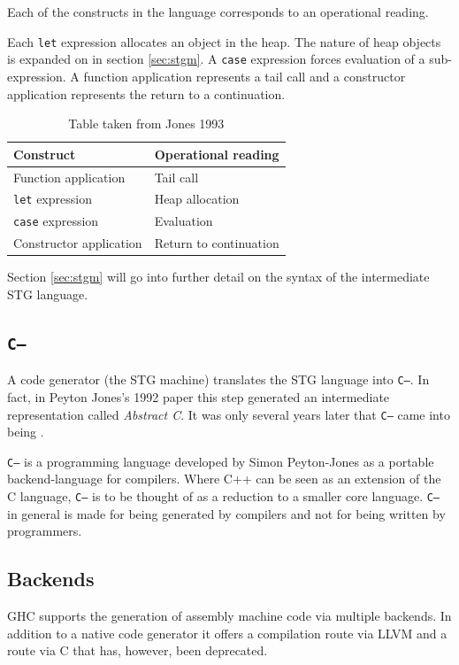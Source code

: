 \documentclass[runningheads]{llncs}
\begin{document}
Each of the constructs in the language corresponds to an operational reading.

Each \texttt{let} expression allocates an object in the heap. The nature of heap objects is expanded on in section \ref{sec:stgm}. A \texttt{case} expression forces evaluation of a sub-expression. A function application represents a tail call and a constructor application represents the return to a continuation. 

\begin{table}[H]
	\centering
	
	\begin{tabular}{|l|l|}
		\hline 
		Construct & Operational reading  \\ 
		\hline 
		Function application	& Tail call  \\  
		\texttt{let} expression	& Heap allocation  \\ 
		\texttt{case} expression	& Evaluation  \\ 
		Constructor application	& Return to continuation  \\ 
		\hline 
	\end{tabular} 
	\caption{Table taken from Jones 1993 \cite{jones1992implementing}}
\end{table}

Section \ref{sec:stgm} will go into further detail on the syntax of the intermediate STG language.

\subsection{\texttt{C--}}
\label{subsec:C--}

A code generator (the STG machine) translates the STG language into \texttt{C--}. In fact, in Peyton Jones's 1992 paper \cite{jones1992implementing} this step generated an intermediate representation called \textit{Abstract C}. It was only several years later that \texttt{C--} came into being \cite{jones1999c}.

\texttt{C--} is a programming language developed by Simon Peyton-Jones as a portable backend-language for compilers. Where C++ can be seen as an extension of the C language, \texttt{C--} is to be thought of as a reduction to a smaller core language. \texttt{C--} in general is made for being generated by compilers and not for being written by programmers. \cite{jones1999c}

\subsection{Backends}
GHC supports the generation of assembly machine code via multiple backends. In addition to a native code generator it offers a compilation route via LLVM and a route via C that has, however, been deprecated.
\end{document}

